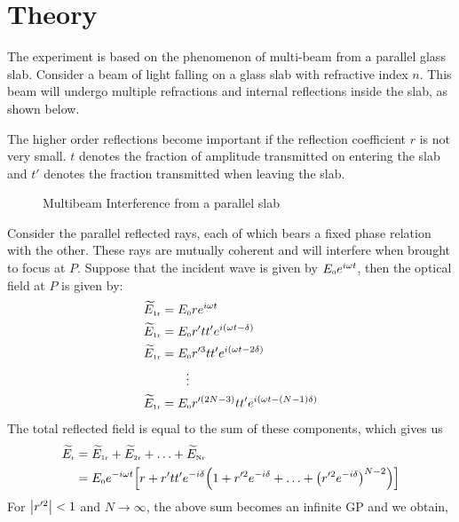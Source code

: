 \section{Theory}
The experiment is based on the phenomenon of multi-beam  from a parallel glass slab. Consider a beam of light falling on a glass slab with refractive index $n$. This beam will undergo multiple refractions and internal reflections inside the slab, as shown below.

The higher order reflections become important if the reflection coefficient $r$ is not very small. $t$ denotes the fraction of amplitude transmitted on entering the slab and $t'$ denotes the fraction transmitted when leaving the slab.
\begin{figure}[H]
  \centering 
  
  \caption{Multibeam Interference from a parallel slab}
\end{figure}
\noindent
Consider the parallel reflected rays, each of which bears a fixed phase relation with the other. These rays are mutually coherent and will interfere when brought to focus at $P$. Suppose that the incident wave is given by $E_{\text{\tiny 0}}e^{i\omega t}$, then the optical field at $P$ is given by:
\begin{align}
    \begin{split}
        \widetilde{E}_{\text{\tiny 1r}}&=E_{\text{\tiny 0}}r e^{i\omega t}\\ 
         \widetilde{E}_{\text{\tiny 1r}}&=E_{\text{\tiny 0}}r' t t' e^{i(\omega t-\delta)}\\ 
          \widetilde{E}_{\text{\tiny 1r}}&=E_{\text{\tiny 0}}r'^3 tt' e^{i(\omega t-2\delta)}\\ 
         & \qquad \vdots\\
           \widetilde{E}_{\text{\tiny 1r}}&=E_{\text{\tiny 0}}r'^{(2N-3)} tt' e^{i(\omega t-(N-1)\delta)}\\ 
    \end{split}
\end{align}
The total reflected field is equal to the sum of these components, which gives us 
\begin{align}
    \begin{split}
        \widetilde{E}_{\text{\tiny r}} &= \widetilde{E}_{\text{\tiny 1r}}+\widetilde{E}_{\text{\tiny 2r}}+\ldots+ \widetilde{E}_{\text{\tiny Nr}}\\
        &=E_{\text{\tiny 0}}e^{-i\omega t}\qty[r + r'tt' e^{-i\delta}\qty(1 + r'^2 e^{-i\delta}+\ldots+ \qty(r'^2e^{-i\delta})^{N-2})]
    \end{split}
\end{align}
For $\abs{r'^2}<1$ and $N\to \infty$, the above sum becomes an infinite GP and we obtain,  
